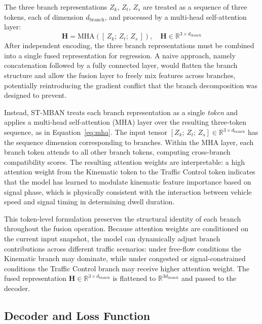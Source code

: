 \documentclass[journal]{IEEEtran}
\begin{document}
The three branch representations $Z_k$, $Z_t$, $Z_s$ are treated as a sequence of three tokens, each of dimension $d_\text{branch}$, and processed by a multi-head self-attention layer:
\begin{equation}
    \mathbf{H} = \text{MHA}\!\left([\,Z_k;\, Z_t;\, Z_s\,]\right), \quad \mathbf{H} \in \mathbb{R}^{3 \times d_\text{branch}}
    \label{eq:mha}
\end{equation}
After independent encoding, the three branch representations must be combined into a single fused representation for regression.
A naive approach, namely concatenation followed by a fully connected layer, would flatten the branch structure and allow the fusion layer to freely mix features across branches, potentially reintroducing the gradient conflict that the branch decomposition was designed to prevent.

Instead, ST-MBAN treats each branch representation as a single \emph{token} and applies a multi-head self-attention (MHA) layer over the resulting three-token sequence, as in Equation~\eqref{eq:mha}.
The input tensor $[Z_k;\, Z_t;\, Z_s] \in \mathbb{R}^{3 \times d_\text{branch}}$ has the sequence dimension corresponding to branches.
Within the MHA layer, each branch token attends to all other branch tokens, computing cross-branch compatibility scores.
The resulting attention weights are interpretable: a high attention weight from the Kinematic token to the Traffic Control token indicates that the model has learned to modulate kinematic feature importance based on signal phase, which is physically consistent with the interaction between vehicle speed and signal timing in determining dwell duration.

This token-level formulation preserves the structural identity of each branch throughout the fusion operation.
Because attention weights are conditioned on the current input snapshot, the model can dynamically adjust branch contributions across different traffic scenarios: under free-flow conditions the Kinematic branch may dominate, while under congested or signal-constrained conditions the Traffic Control branch may receive higher attention weight.
The fused representation $\mathbf{H} \in \mathbb{R}^{3 \times d_\text{branch}}$ is flattened to $\mathbb{R}^{3 d_\text{branch}}$ and passed to the decoder.

\subsection{Decoder and Loss Function}
\end{document}
